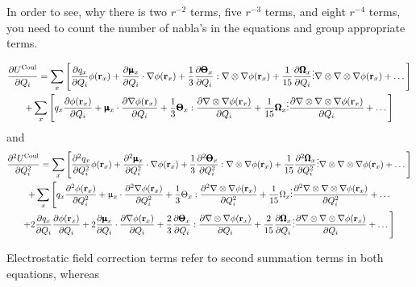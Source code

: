 \documentclass{exam}
\newcommand{\fderiv}[2]{\ensuremath{
\frac{\partial #1}{\partial #2}}}
\newcommand{\sderiv}[2]{\ensuremath{
\frac{\partial^2 #1}{\partial #2^2}
}}
\begin{document}
\begin{questions}
\begin{solution}
In order to see, why there is two $r^{-2}$ terms, five $r^{-3}$ terms, and eight
$r^{-4}$ terms,
you need to count the number of nabla's in the equations and group appropriate terms.
%
\begin{tiny}
\begin{multline} \label{x:726439}
 \fderiv{U^{\rm Coul}}{Q_i} =
%
\sum_x 
\Bigg[ 
  \fderiv{q_x}{Q_i} \phi({\bf r}_x) + 
  \fderiv{\pmb{\upmu}_x}{Q_i} \cdot { \nabla} \phi({\bf r}_x) + \frac{1}{3}  
  \fderiv{\pmb{\Theta}_x}{Q_i} : { \nabla}\otimes{ \nabla} \phi({\bf r}_x)  + \frac{1}{15}   
  \fderiv{\pmb{ \Omega}_x}{Q_i} \vdots { \nabla}\otimes{ \nabla}\otimes{ \nabla} \phi({\bf r}_x) + \ldots 
\Bigg] 
% 
\\+
%
\sum_x 
\Bigg[ 
  q_x \fderiv{\phi({\bf r}_x)}{Q_i} + 
  \pmb{\upmu}_x \cdot \fderiv{{\nabla} \phi({\bf r}_x)}{Q_i} + \frac{1}{3} 
  \pmb{\Theta}_x : \fderiv{{\nabla}\otimes{\nabla} \phi({\bf r}_x)}{Q_i} + \frac{1}{15}
  \pmb{\Omega}_x \vdots \fderiv{{\nabla}\otimes{\nabla}\otimes{\nabla} \phi({\bf r}_x)}{Q_i} + \ldots 
\Bigg]
\end{multline}
%
and
%
\begin{multline} \label{x:726440}
 \sderiv{U^{\rm Coul}}{Q_i} =
%
\sum_x 
\Bigg[ 
  \sderiv{q_x}{Q_i} \phi({\bf r}_x) + 
  \sderiv{\pmb{\upmu}_x}{Q_i} \cdot {\nabla} \phi({\bf r}_x) + \frac{1}{3}  
  \sderiv{\pmb{\Theta}_x}{Q_i} : {\nabla}\otimes{\nabla} \phi({\bf r}_x) + \frac{1}{15}   
  \sderiv{\pmb{\Omega}_x}{Q_i} \vdots {\nabla}\otimes{\nabla}\otimes{\nabla} \phi({\bf r}_x) + \ldots 
\Bigg] 
%
\\+
%
\sum_x 
\Bigg[ 
  q_x \sderiv{\phi({\bf r}_x)}{Q_i} + 
  {\upmu}_x \cdot \sderiv{{\nabla} \phi({\bf r}_x)}{Q_i}  + \frac{1}{3} 
  {\Theta}_x : \sderiv{{\nabla}\otimes{\nabla} \phi({\bf r}_x)}{Q_i} + \frac{1}{15}
  {\Omega}_x \vdots \sderiv{{\nabla}\otimes{\nabla}\otimes{\nabla} \phi({\bf r}_x)}{Q_i} + \ldots
\\
%
+2\fderiv{q_x}{Q_i} \fderiv{\phi({\bf r}_x)}{Q_i} 
+2\fderiv{\pmb{ \upmu}_x}{Q_i} \cdot \fderiv{{ \nabla} \phi({\bf r}_x)}{Q_i}
+ \frac{2}{3}  
  \fderiv{\pmb{ \Theta}_x}{Q_i} : \fderiv{{ \nabla}\otimes{ \nabla} \phi({\bf r}_x)}{Q_i} 
+ \frac{2}{15}   
  \fderiv{\pmb{ \Omega}_x}{Q_i} \vdots \fderiv{{ \nabla}\otimes{ \nabla}\otimes{ \nabla} \phi({\bf r}_x)}{Q_i}
+ \ldots
\Bigg]
\end{multline}
\end{tiny}
%
\noindent
Electrostatic field correction terms refer to second summation terms in both equations, whereas

\end{solution}
\end{questions}
\end{document}

